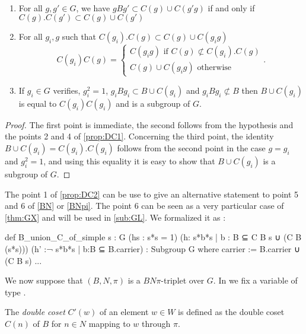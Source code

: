 \begin{proprietes} \label{prop:DC2} \
    \begin{enumerate}
\item For all $g,g' \in G$, we have  $g B g' \subset C(g) \cup C(g'g) $ if and only if $C(g). C(g') \subset C(g) \cup  C(g')$
\item For all $g_i, g$ such that $C(g_i).C(g) \subset C(g) \cup C(g_i g)$
     \[
     C(g_i) C(g) = \begin{cases}
         C(g_ig) \text{ if } C(g) \not \subset C(g_i).C(g)\\
         C(g) \cup C(g_ig) \text{ otherwise}
     \end{cases}
     .\] 
 \item If $g_{i} \in G$ verifies, $g_{i}^2 = 1$,  $g_{i} B g_{i} \subset B \cup C(g_{i})$ and $g_{i} B g_{i} \not\subset B$ then $B \cup C(g_{i})$  is equal to $C(g_i) C(g_i)$ and is a subgroup of $G$.
    \end{enumerate}
\end{proprietes}

\begin{proof}
The first point is immediate, the second follows from the hypothesis and the points 2 and 4 of \ref{prop:DC1}. Concerning the third point, the identity $B \cup C(g_{i}) = C(g_i). C\left( g_i \right)$  follows from the second point in the case $g = g_i$ and $g_i ^2 = 1$, and using this equality it is easy to show that $B \cup C(g_i)$ is a subgroup of $G$.
\end{proof} 

\begin{remarque}
The point 1 of \ref{prop:DC2} can be use to give an alternative statement to point 5 and 6 of \ref{BN} or \ref{BNpi}. The point $6$ can be seen as a very particular case of \ref{thm:GX} and will be used in \ref{sub:GL}. We formalized it as :
\begin{leancode}
def B_union_C_of_simple {s : G} (hs : s*s = 1) (h: {s*b*s | b : B} ⊆ C B s ∪ (C B (s*s)))
    (h' :¬ {s*b*s | b:B} ⊆ B.carrier) : Subgroup G where
  carrier := B.carrier ∪ (C B s)
  ...
\end{leancode}
\end{remarque}

We now suppose that $\left( B,N, \pi \right)$ is a $BN\pi$-triplet over $G$. In \Lean we fix a variable  of type . 

\begin{definition} \label{def:BNDC}
The \emph{double coset} $C'(w)$ of an element $w\in W$ is defined as the double coset $C(n)$ of $B$ for $n \in N$ mapping to $w$ through $\pi$.
\end{definition}

